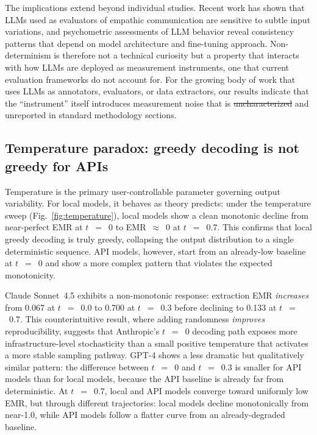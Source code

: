 \documentclass[sn-nature]{sn-jnl}
\makeatletter
\providecommand{\DIFadd}[1]{{\protect\color{blue}\uwave{#1}}} %
\providecommand{\DIFdel}[1]{{\protect\color{red}\sout{#1}}} %
\providecommand{\DIFaddbegin}{} %
\providecommand{\DIFaddend}{} %
\providecommand{\DIFdelbegin}{} %
\providecommand{\DIFdelend}{} %
\providecommand{\DIFscaledelfig}{0.5}
\newlength{\DIFdelgraphicswidth} %
\newlength{\DIFdelgraphicsheight} %
\providecommand{\DIFaddincludegraphics}[2][]{{\color{blue}\fbox{\DIFOincludegraphics[#1]{#2}}}} %
\providecommand{\DIFdelincludegraphics}[2][]{%
\sbox{\DIFdelgraphicsbox}{\DIFOincludegraphics[#1]{#2}}%
\settoboxwidth{\DIFdelgraphicswidth}{\DIFdelgraphicsbox} %
\settoboxtotalheight{\DIFdelgraphicsheight}{\DIFdelgraphicsbox} %
\scalebox{\DIFscaledelfig}{%
\parbox[b]{\DIFdelgraphicswidth}{\usebox{\DIFdelgraphicsbox}\\[-\baselineskip] \rule{\DIFdelgraphicswidth}{0em}}\llap{\resizebox{\DIFdelgraphicswidth}{\DIFdelgraphicsheight}{%
\setlength{\unitlength}{\DIFdelgraphicswidth}%
\begin{picture}(1,1)%
\thicklines\linethickness{2pt} %
{\color[rgb]{1,0,0}\put(0,0){\framebox(1,1){}}}%
{\color[rgb]{1,0,0}\put(0,0){\line( 1,1){1}}}%
{\color[rgb]{1,0,0}\put(0,1){\line(1,-1){1}}}%
\end{picture}%
}\hspace*{3pt}}} %
} %
\DeclareRobustCommand{\DIFaddbegin}{\DIFOaddbegin \let\includegraphics\DIFaddincludegraphics} %
\DeclareRobustCommand{\DIFaddend}{\DIFOaddend \let\includegraphics\DIFOincludegraphics} %
\DeclareRobustCommand{\DIFdelbegin}{\DIFOdelbegin \let\includegraphics\DIFdelincludegraphics} %
\DeclareRobustCommand{\DIFdelend}{\DIFOaddend \let\includegraphics\DIFOincludegraphics} %
\let\sout@orig\sout %
\renewcommand{\sout}[1]{\ifmmode\text{\sout@orig{\ensuremath{#1}}}\else\sout@orig{#1}\fi} %
\makeatother
\begin{document}
The implications extend beyond individual studies.
Recent work has shown that LLMs used as evaluators of empathic communication are sensitive to subtle input variations\cite{kumar2026reliable}, and psychometric assessments of LLM behavio\DIFaddbegin \DIFadd{u}\DIFaddend r reveal consistency patterns that depend on model architecture and fine-tuning approach\cite{serapiogarcía2025psychometric}.
Non-determinism is therefore not a technical curiosity but a property that interacts with how LLMs are deployed as measurement instruments, one that current evaluation frameworks do not account for.
For the growing body of work that uses LLMs as annotators, evaluators, or data extractors, our results indicate that the ``instrument'' itself introduces measurement noise that is \DIFdelbegin \DIFdel{uncharacterized }\DIFdelend \DIFaddbegin \DIFadd{uncharacterised }\DIFaddend and unreported in standard methodology sections.


\subsection{Temperature paradox: greedy decoding is not greedy for APIs}\label{subsec:temperature}

Temperature is the primary user-controllable parameter governing output variability.
For local models, it behaves as theory predicts: under the temperature sweep (Fig.~\ref{fig:temperature}), local models show a clean monotonic decline from near-perfect EMR at $t$~$=$~0 to EMR~$\approx$~0 at $t$~$=$~0.7.
This confirms that local greedy decoding is truly greedy, collapsing the output distribution to a single deterministic sequence.
API models, however, start from an already-low baseline at $t$~$=$~0 and show a more complex pattern that violates the expected monotonicity.

Claude Sonnet~4.5 exhibits a non-monotonic response: extraction EMR \emph{increases} from 0.067 at $t$~$=$~0.0 to 0.700 at $t$~$=$~0.3 before declining to 0.133 at $t$~$=$~0.7.
This counterintuitive result, where adding randomness \emph{improves} reproducibility, suggests that Anthropic's $t$~$=$~0 decoding path exposes more infrastructure-level stochasticity than a small positive temperature that activates a more stable sampling pathway.
GPT-4 shows a less dramatic but qualitatively similar pattern: the difference between $t$~$=$~0 and $t$~$=$~0.3 is smaller for API models than for local models, because the API baseline is already far from deterministic.
At $t$~$=$~0.7, local and API models converge toward uniformly low EMR, but through different trajectories: local models decline monotonically from near-1.0, while API models follow a flatter curve from an already-degraded baseline.
\end{document}
